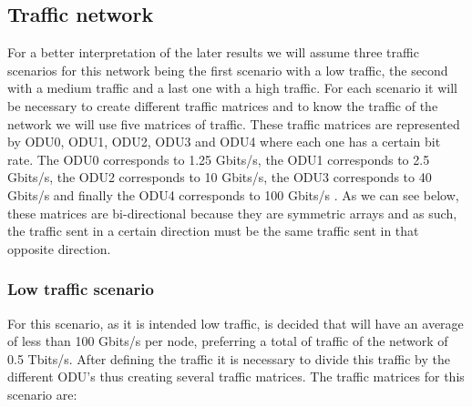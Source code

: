 \subsection{Traffic network}\label{Reference_Network_Traffic}

For a better interpretation of the later results we will assume three traffic scenarios for this network being the first scenario with a low traffic, the second with a medium traffic and a last one with a high traffic.
For each scenario it will be necessary to create different traffic matrices and to know the traffic of the network we will use five matrices of traffic.
These traffic matrices are represented by ODU0, ODU1, ODU2, ODU3 and ODU4 where each one has a certain bit rate.
The ODU0 corresponds to 1.25 Gbits/s, the ODU1 corresponds to 2.5 Gbits/s, the ODU2 corresponds to 10 Gbits/s, the ODU3 corresponds to 40 Gbits/s and finally the ODU4 corresponds to 100 Gbits/s \cite{alcatel}.
As we can see below, these matrices are bi-directional because they are symmetric arrays and as such, the traffic sent in a certain direction must be the same traffic sent in that opposite direction.

\subsubsection{Low traffic scenario}\label{low_scenario}

For this scenario, as it is intended low traffic, is decided that will have an average of less than 100 Gbits/s per node, preferring a total of traffic of the network of 0.5 Tbits/s.
After defining the traffic it is necessary to divide this traffic by the different ODU's thus creating several traffic matrices.
The traffic matrices for this scenario are:

